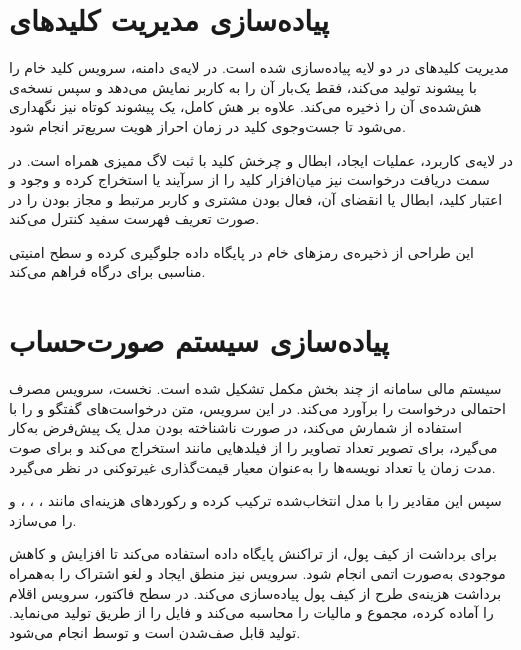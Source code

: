 \section{پیاده‌سازی مدیریت کلیدهای }

مدیریت کلیدهای  در دو لایه پیاده‌سازی شده است. در لایه‌ی دامنه،
سرویس  کلید خام را با پیشوند  تولید می‌کند،
فقط یک‌بار آن را به کاربر نمایش می‌دهد و سپس نسخه‌ی هش‌شده‌ی آن را
ذخیره می‌کند. علاوه بر هش کامل، یک پیشوند کوتاه نیز نگهداری می‌شود تا
جست‌وجوی کلید در زمان احراز هویت سریع‌تر انجام شود.

در لایه‌ی کاربرد، عملیات ایجاد، ابطال و چرخش کلید با ثبت لاگ ممیزی همراه
است. در سمت دریافت درخواست نیز میان‌افزار  کلید
را از سرآیند  یا  استخراج کرده و
وجود و اعتبار کلید، ابطال یا انقضای آن، فعال بودن مشتری و کاربر مرتبط و
مجاز بودن  را در صورت تعریف فهرست سفید کنترل می‌کند.

این طراحی از ذخیره‌ی رمزهای خام در پایگاه داده جلوگیری کرده و سطح امنیتی
مناسبی برای درگاه فراهم می‌کند.

\section{پیاده‌سازی سیستم صورت‌حساب}

سیستم مالی سامانه از چند بخش مکمل تشکیل شده است. نخست، سرویس
 مصرف احتمالی درخواست را برآورد می‌کند. در این
سرویس، متن درخواست‌های گفتگو و  را با استفاده از
 شمارش می‌کند، در صورت
ناشناخته بودن مدل یک  پیش‌فرض به‌کار می‌گیرد، برای تصویر
تعداد تصاویر را از فیلدهایی مانند  استخراج می‌کند و برای صوت
مدت زمان یا تعداد نویسه‌ها را به‌عنوان معیار قیمت‌گذاری غیرتوکنی در نظر
می‌گیرد.

سپس  این مقادیر را با 
مدل انتخاب‌شده ترکیب کرده و رکوردهای هزینه‌ای مانند ،
، ،  و
 را می‌سازد.

برای برداشت از کیف پول،  از تراکنش پایگاه داده
استفاده می‌کند تا افزایش و کاهش موجودی به‌صورت اتمی انجام شود. سرویس
 نیز منطق ایجاد و لغو اشتراک را به‌همراه برداشت
هزینه‌ی طرح از کیف پول پیاده‌سازی می‌کند. در سطح فاکتور، سرویس
 اقلام را آماده کرده، مجموع و مالیات را محاسبه می‌کند
و فایل  را از طریق  تولید می‌نماید. تولید 
قابل صف‌شدن است و توسط  انجام می‌شود.

